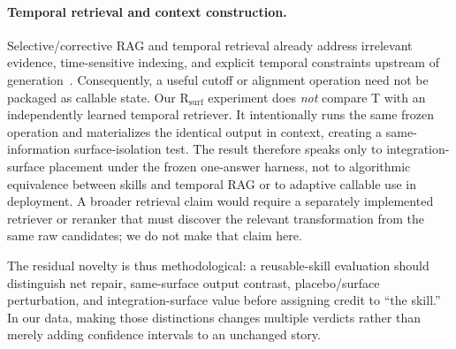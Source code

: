 \paragraph{Temporal retrieval and context construction.}
Selective/corrective RAG and temporal retrieval already address irrelevant evidence, time-sensitive indexing, and explicit temporal constraints upstream of generation~\citep{asai2024selfrag,yan2024crag,zhang2025mrag,abdallah2026tempretriever,han2025temporalgraphs,wang2026iarag,liu2026chronos}. Consequently, a useful cutoff or alignment operation need not be packaged as callable state. Our R$_{\mathrm{surf}}$ experiment does \emph{not} compare T with an independently learned temporal retriever. It intentionally runs the same frozen operation and materializes the identical output in context, creating a same-information surface-isolation test. The result therefore speaks only to integration-surface placement under the frozen one-answer harness, not to algorithmic equivalence between skills and temporal RAG or to adaptive callable use in deployment. A broader retrieval claim would require a separately implemented retriever or reranker that must discover the relevant transformation from the same raw candidates; we do not make that claim here.

The residual novelty is thus methodological: a reusable-skill evaluation should distinguish net repair, same-surface output contrast, placebo/surface perturbation, and integration-surface value before assigning credit to ``the skill.'' In our data, making those distinctions changes multiple verdicts rather than merely adding confidence intervals to an unchanged story.
